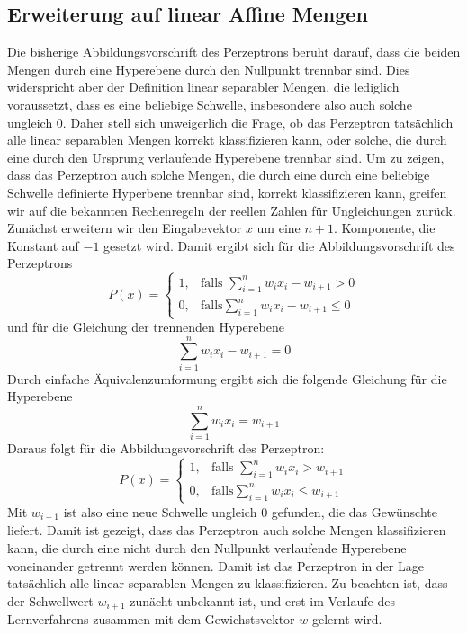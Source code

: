 \documentclass[a4paper]{scrartcl}
\begin{document}
\begin{multicols}{2}
            \subsection{Erweiterung auf linear Affine Mengen}
                Die bisherige Abbildungsvorschrift des Perzeptrons beruht darauf, dass die beiden Mengen durch eine Hyperebene durch den Nullpunkt trennbar sind. Dies widerspricht aber der Definition linear separabler Mengen, die lediglich voraussetzt, dass es eine beliebige Schwelle, insbesondere also auch solche ungleich $0$. Daher stell sich unweigerlich die Frage, ob das Perzeptron tatsächlich alle linear separablen Mengen korrekt klassifizieren kann, oder solche, die durch eine durch den Ursprung verlaufende Hyperebene trennbar sind. Um zu zeigen, dass das Perzeptron auch solche Mengen, die durch eine durch eine beliebige Schwelle definierte Hyperbene trennbar sind, korrekt klassifizieren kann, greifen wir auf die bekannten Rechenregeln der reellen Zahlen für Ungleichungen zurück.
                Zunächst erweitern wir den Eingabevektor $x$ um eine $n+1$. Komponente, die Konstant auf $-1$ gesetzt wird.
                \newline 
                Damit ergibt sich für die Abbildungsvorschrift des Perzeptrons 
                $$
                    P(x)=\left\{\begin{array}{cl} 1, & \mbox{falls }\sum_{i=1}^nw_ix_i - w_{i+1} > 0\\ 0, & \mbox{falls} \sum_{i=1}^n w_ix_i - w_{i+1} \leq 0 \end{array}\right. 
                $$
                und für die Gleichung der trennenden Hyperebene
                $$
                    \sum_{i=1}^nw_ix_i - w_{i+1} = 0
                $$
                Durch einfache Äquivalenzumformung ergibt sich die folgende Gleichung für die Hyperebene
                    $$
                        \sum_{i=1}^nw_ix_i = w_{i+1}
                    $$
                    Daraus folgt für die Abbildungsvorschrift des Perzeptron:
                    $$
                    P(x)=\left\{\begin{array}{cl} 1, & \mbox{falls }\sum_{i=1}^nw_ix_i > w_{i+1}\\ 0, & \mbox{falls} \sum_{i=1}^n w_ix_i \leq w_{i+1} \end{array}\right. 
                    $$
                    Mit $w_{i+1}$ ist also eine neue Schwelle ungleich $0$ gefunden, die das Gewünschte liefert. Damit ist gezeigt, dass das Perzeptron auch solche Mengen klassifizieren kann, die durch eine nicht durch den Nullpunkt verlaufende Hyperebene voneinander getrennt werden können. Damit ist das Perzeptron in der Lage tatsächlich alle linear separablen Mengen zu klassifizieren.
                    \newline
                    Zu beachten ist, dass der Schwellwert $w_{i+1}$ zunächt unbekannt ist, und erst im Verlaufe des Lernverfahrens zusammen mit dem Gewichstsvektor $w$ gelernt wird.

\end{multicols}
\end{document}
